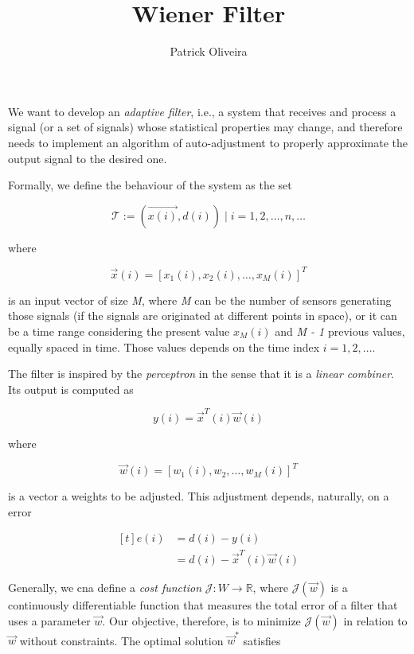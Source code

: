 \documentclass[twocolumn]{article}
\title{Wiener Filter}
\author{Patrick Oliveira}
\affil{}
\begin{document}
\maketitle

We want to develop an \textit{adaptive filter}, i.e., a system that receives and process a signal (or a set of signals) whose statistical properties may change, and therefore needs to implement an algorithm of auto-adjustment to properly approximate the output signal to the desired one.

Formally, we define the behaviour of the system as the set

$$ \mathcal{T} := { (\vec{x(i)}, d(i))\;|\; i = 1, 2, \ldots, n, \ldots} $$

\noindent where 

$$ \vec{x} (i) = \left[ x_{1} (i), x_{2} (i), \ldots, x_{M} (i) \right]^{T} $$

\noindent is an input vector of size \textit{M}, where \textit{M} can be the number of sensors generating those signals (if the signals are originated at different points in space), or it can be a time range considering the present value $ x_M (i) $ and \textit{M - 1} previous values, equally spaced in time. Those values depends on the time index $ i = 1, 2, \ldots $.

The filter is inspired by the \textit{perceptron} in the sense that it is a \textit{linear combiner}. Its output is computed as

$$ y (i) = \vec{x}^{T} (i) \vec{w} (i) $$

\noindent where

$$ \vec{w} (i) = \left[ w_{1} (i), w_{2}, \ldots, w_{M} (i) \right]^{T} $$

\noindent is a vector a weights to be adjusted. This adjustment depends, naturally, on a error

$$ \begin{aligned}[t]
	e (i) &= d (i) - y (i) \\
	      &= d (i) - \vec{x}^{T} (i) \vec{w} (i)
\end{aligned} $$

Generally, we cna define a \textit{cost function} $ \mathcal{J} : W \rightarrow \mathbb{R} $, where $ \mathcal{J} ( \vec{w}) $ is a continuously differentiable function that measures the total error of a filter that uses a parameter $ \vec{w} $. Our objective, therefore, is to minimize $ \mathcal{J} ( \vec{w}) $ in relation to $ \vec{w} $ without constraints. The optimal solution $ \vec{w}^{*} $ satisfies
\end{document}
